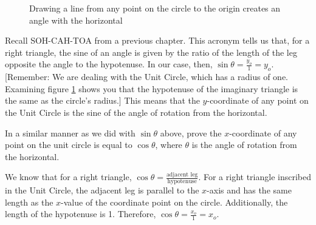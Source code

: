 \begin{figure}[htbp]
    \centering
    \caption{Drawing a line from any point on the circle to the origin creates 
    an angle with the horizontal}
    \label{fig:unit_cicle_zoom}
\end{figure}

Recall SOH-CAH-TOA from a previous chapter. This acronym tells us that, for a 
right triangle, the sine of an angle is given by the ratio of the length of the
leg opposite the angle to the hypotenuse. In our case, then, $\sin{\theta} = 
\frac{y_o}{1} = y_o$. [Remember: We are dealing with the Unit Circle, which has
a radius of one. Examining figure \ref{fig:unit_cicle_zoom} shows you that the 
hypotenuse of the imaginary triangle is the same as the circle's radius.] This 
means that the $y$-coordinate of any point on the Unit Circle is the sine of 
the angle of rotation from the horizontal. 

\begin{Exercise}[label = sine]
In a similar manner as we did with $\sin{\theta}$ above, prove the 
$x$-coordinate of any point on the unit circle is equal to $\cos{\theta}$, 
where $\theta$ is the angle of rotation from the horizontal. 
\vspace{20mm}
\end{Exercise}

\begin{Answer}[ref = sine]
We know that for a right triangle, $\cos{\theta} = \frac{\text{adjacent leg}}{
\text{hypotenuse}}$. For a right triangle inscribed in the Unit Circle, the 
adjacent leg is parallel to the $x$-axis and has the same length as the 
$x$-value of the coordinate point on the circle. Additionally, the length of 
the hypotenuse is 1. Therefore, $\cos{\theta} = \frac{x_o}{1} = x_o$. 
\end{Answer}

